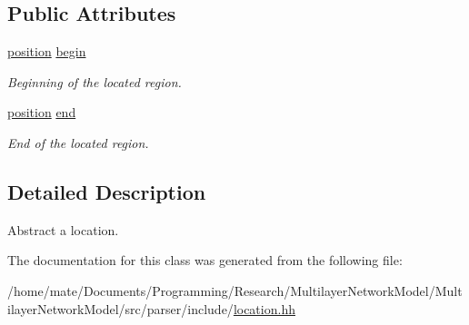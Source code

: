 \subsection*{Public Attributes}
\begin{DoxyCompactItemize}
\item 
\hyperlink{classEquationParser_1_1position}{position} \hyperlink{classEquationParser_1_1location_aa1fdd6decfaa33b12c14a71895c6c5cb}{begin}\hypertarget{classEquationParser_1_1location_aa1fdd6decfaa33b12c14a71895c6c5cb}{}\label{classEquationParser_1_1location_aa1fdd6decfaa33b12c14a71895c6c5cb}

\begin{DoxyCompactList}\small\item\em Beginning of the located region. \end{DoxyCompactList}\item 
\hyperlink{classEquationParser_1_1position}{position} \hyperlink{classEquationParser_1_1location_a6399485d967cdee3a129a748a2b385f7}{end}\hypertarget{classEquationParser_1_1location_a6399485d967cdee3a129a748a2b385f7}{}\label{classEquationParser_1_1location_a6399485d967cdee3a129a748a2b385f7}

\begin{DoxyCompactList}\small\item\em End of the located region. \end{DoxyCompactList}\end{DoxyCompactItemize}


\subsection{Detailed Description}
Abstract a location. 

The documentation for this class was generated from the following file\+:\begin{DoxyCompactItemize}
\item 
/home/mate/\+Documents/\+Programming/\+Research/\+Multilayer\+Network\+Model/\+Multilayer\+Network\+Model/src/parser/include/\hyperlink{location_8hh}{location.\+hh}\end{DoxyCompactItemize}
